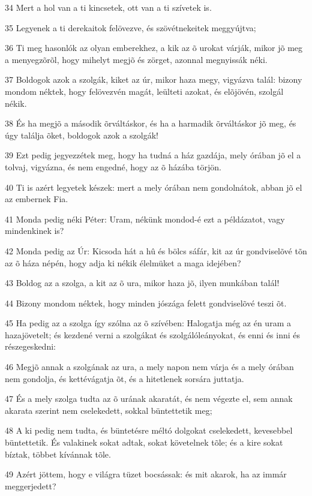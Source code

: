 \par 34 Mert a hol van a ti kincsetek, ott van a ti szívetek is.
\par 35 Legyenek a ti derekaitok felövezve, és szövétnekeitek meggyújtva;
\par 36 Ti meg hasonlók az olyan emberekhez, a kik az õ urokat várják, mikor jõ meg a menyegzõrõl, hogy mihelyt megjõ és zörget, azonnal megnyissák néki.
\par 37 Boldogok azok a szolgák, kiket az úr, mikor haza megy, vigyázva talál: bizony mondom néktek, hogy felövezvén magát, leülteti azokat, és elõjövén, szolgál  nékik.
\par 38 És ha megjõ a második õrváltáskor, és ha a harmadik õrváltáskor jõ meg, és úgy találja õket, boldogok azok a szolgák!
\par 39 Ezt pedig jegyezzétek meg, hogy ha tudná a ház gazdája, mely órában jõ el a tolvaj, vigyázna, és nem engedné, hogy az õ házába törjön.
\par 40 Ti is azért legyetek készek: mert a mely órában nem gondolnátok, abban jõ el az embernek Fia.
\par 41 Monda pedig néki Péter: Uram, nékünk mondod-é ezt a példázatot, vagy mindenkinek is?
\par 42 Monda pedig az Úr: Kicsoda hát a hû és bölcs sáfár, kit az úr gondviselõvé tõn az õ háza népén, hogy adja ki nékik élelmüket a maga idejében?
\par 43 Boldog az a szolga, a kit az õ ura, mikor haza jõ, ilyen munkában talál!
\par 44 Bizony mondom néktek, hogy minden jószága felett gondviselõvé teszi õt.
\par 45 Ha pedig az a szolga így szólna az õ szívében: Halogatja még az én uram a hazajövetelt; és kezdené verni a szolgákat és szolgálóleányokat, és enni és inni és részegeskedni:
\par 46 Megjõ annak a szolgának az ura, a mely napon nem várja és a mely órában nem gondolja, és kettévágatja õt, és a hitetlenek sorsára juttatja.
\par 47 És a mely szolga tudta az õ urának akaratát, és nem végezte el, sem annak akarata szerint nem cselekedett, sokkal büntettetik meg;
\par 48 A ki pedig nem tudta, és büntetésre méltó dolgokat cselekedett, kevesebbel büntettetik. És valakinek sokat adtak, sokat követelnek tõle; és a kire sokat bíztak, többet kívánnak tõle.
\par 49 Azért jöttem, hogy e világra tüzet bocsássak: és mit akarok, ha az immár meggerjedett?
